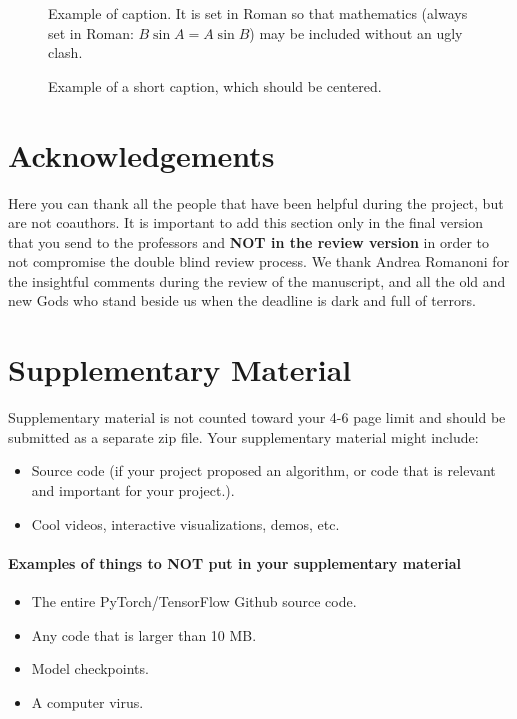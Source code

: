 \documentclass[10pt,twocolumn,letterpaper]{article}
\begin{document}
\begin{figure}[t]
\begin{center}
\fbox{\rule{0pt}{2in} \rule{0.9\linewidth}{0pt}}
\end{center}
   \caption{Example of caption.  It is set in Roman so that mathematics
   (always set in Roman: $B \sin A = A \sin B$) may be included without an
   ugly clash.}
\label{fig:long}
\label{fig:onecol}
\end{figure}


\begin{figure}
\begin{center}
\fbox{\rule{0pt}{2in} \rule{.9\linewidth}{0pt}}
\end{center}
   \caption{Example of a short caption, which should be centered.}
\label{fig:short}
\end{figure}

\section*{Acknowledgements}
Here you can thank all the people that have been helpful during the project, but are not coauthors. It is important to add this section only in the final version that you send to the professors and \textbf{NOT in the review version} in order to not compromise the double blind review process. We thank Andrea Romanoni for the insightful comments during the review of the manuscript, and all the old and new Gods who stand beside us when the deadline is dark and full of terrors. 

\appendix
\section{Supplementary Material} 
Supplementary material is not counted toward your 4-6 page limit and should be submitted as a separate zip file. Your supplementary material might include:
\begin{itemize}
    \item Source code (if your project proposed an algorithm, or code that is relevant and important for your project.).
    \item Cool videos, interactive visualizations, demos, etc.
\end{itemize}

\paragraph{Examples of things to NOT put in your supplementary material}
\begin{itemize}
    \item The entire PyTorch/TensorFlow Github source code.
    \item Any code that is larger than 10 MB.
    \item Model checkpoints.
    \item A computer virus.
\end{itemize}
\end{document}
